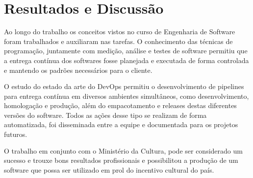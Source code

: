 \chapter[Resultados e Discussão]{Resultados e Discussão}

Ao longo do trabalho os conceitos vistos no curso de Engenharia de Software foram trabalhados e auxiliaram nas tarefas. O conhecimento das técnicas de programação, juntamente com medição, análise e testes de software permitiu que a entrega contínua dos softwares fosse planejada e executada de forma controlada e mantendo os padrões necessários para o cliente.

O estudo do estado da arte do DevOps permitiu o desenvolvimento de pipelines para entrega contínua em diversos ambientes simultâneos, como desenvolvimento, homologação e produção, além do empacotamento e releases destas diferentes versões do software. Todos as ações desse tipo se realizam de forma automatizada, foi disseminada entre a equipe e documentada para os projetos futuros.

O trabalho em conjunto com o Ministério da Cultura, pode ser considerado um sucesso e trouxe bons resultados profissionais e  possibilitou a produção de um software que possa ser utilizado em prol do incentivo cultural do país.
